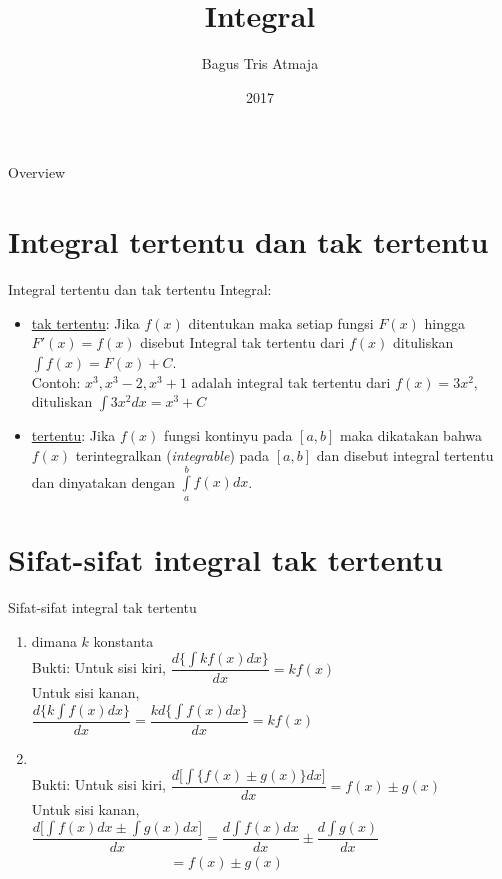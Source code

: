 \documentclass{beamer}
\title{Integral}
\author{Bagus Tris Atmaja}
\date{2017}
\begin{document}
	\frame{\titlepage}
\begin{frame}[t,fragile]{Overview}
\tableofcontents
\end{frame}

\section{Integral tertentu dan tak tertentu}
\begin{frame}[t, fragile]{Integral tertentu dan tak tertentu}
Integral: \\
\begin{itemize}
\item \underline{tak tertentu}: Jika $f(x)$ ditentukan maka setiap fungsi $F(x)$ hingga $F'(x) = f(x)$ disebut Integral tak tertentu dari $f(x)$ dituliskan $\int f(x)= F(x) + C$.\\
\vskip5pt Contoh: $x^3, x^3-2, x^3+1$ adalah integral tak tertentu dari $f(x)=3x^2$, dituliskan $\int 3x^2 dx= x^3 + C$
\vskip10pt
\item \underline{tertentu}: Jika $f(x)$ fungsi kontinyu pada $[a, b]$ maka dikatakan bahwa $f(x)$ terintegralkan (\emph{integrable}) pada $[a, b]$ dan disebut integral tertentu dan dinyatakan dengan $\int \limits_a^{b}f(x) dx$.
\end{itemize}
\end{frame}

\section{Sifat-sifat integral tak tertentu}
\begin{frame}[t, fragile]{Sifat-sifat integral tak tertentu}
\begin{enumerate}
\item {}   dimana $k$ konstanta \\
\vskip5pt
Bukti: Untuk sisi kiri, $\dfrac {d \{ \int k f(x) dx \} } {dx} = k f(x)$ \\
\hspace{30pt} Untuk sisi kanan, \\ 
\hspace{30pt} $ \dfrac {d \{ k \int f(x) dx \} } {dx} = \dfrac {kd \{ \int f(x) dx \} } {dx}=k f(x)$ 
\item {} \\
\vskip5pt
Bukti: Untuk sisi kiri, $ \dfrac {d \bigl[\int \{ f(x) \pm g(x) \} dx \bigr]} {dx} = f(x) \pm g(x) $ \\
\hspace{30pt} Untuk sisi kanan, \\
\vskip5pt
 $ \dfrac {d \bigl[\int f(x) dx \pm \int g(x) dx \bigr]} {dx} = \dfrac {d \int f(x) dx}{dx} \pm \dfrac {d \int g(x)}{dx}$\\
 $\hspace{118pt} = f(x) \pm g(x) $
\end{enumerate}
\end{frame}
\end{document}
